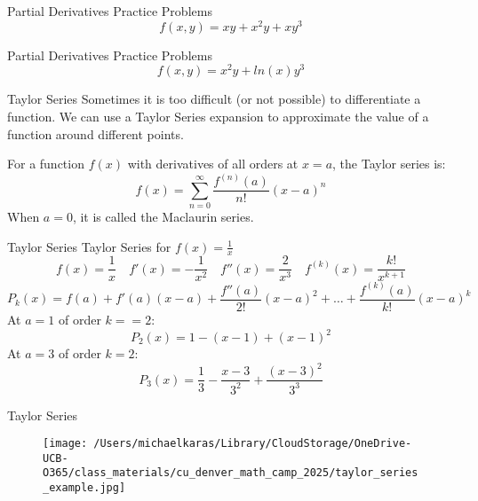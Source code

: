 \documentclass[aspectratio=169]{beamer}
\begin{document}
\begin{frame}{Partial Derivatives Practice Problems}\label{main2}
    \vspace{-4cm}
    \[
    f(x,y) = xy + x^2y + xy^3
    \]
\end{frame}


\begin{frame}{Partial Derivatives Practice Problems}\label{main1}
	\vspace{-4cm}
     \[
    f(x,y) = x^{2}y+ln(x)y^{3}
    \]
\end{frame}

\begin{frame}{Taylor Series}\label{main1}
Sometimes it is too difficult (or not possible) to differentiate a function.  We can use a Taylor Series expansion to approximate the value of a function around different points.

For a function $f(x)$ with derivatives of all orders at $x=a$, the Taylor series is:
\[
f(x) = \sum_{n=0}^{\infty} \frac{f^{(n)}(a)}{n!} (x - a)^n
\]
When $a=0$, it is called the Maclaurin series.

\end{frame}

\begin{frame}{Taylor Series}\label{main1}
Taylor Series for $f(x) = \frac{1}{x}$
\[
f(x) = \frac{1}{x} \quad f'(x) = -\frac{1}{x^2} \quad f''(x) = \frac{2}{x^3} \quad f^{(k)}(x) = \frac{k!}{x^{k+1}}
\]
\[
P_k(x) = f(a) + f'(a)(x - a) + \frac{f''(a)}{2!}(x - a)^2 + \ldots + \frac{f^{(k)}(a)}{k!}(x - a)^k
\]
At $a=1$ of order $k==2$:
\[
P_2(x) = 1 - (x - 1) + (x - 1)^2
\]
At $a=3$ of order $k=2$:
\[
P_3(x) = \frac{1}{3} - \frac{x - 3}{3^2} + \frac{(x - 3)^2}{3^3}
\]

\end{frame}

\begin{frame}{Taylor Series}\label{main1}
    \begin{figure}
        \centering
        \texttt{[image: /Users/michaelkaras/Library/CloudStorage/OneDrive-UCB-O365/class\_materials/cu\_denver\_math\_camp\_2025/taylor\_series\_example.jpg]}
    \end{figure}
\end{frame}
\end{document}
